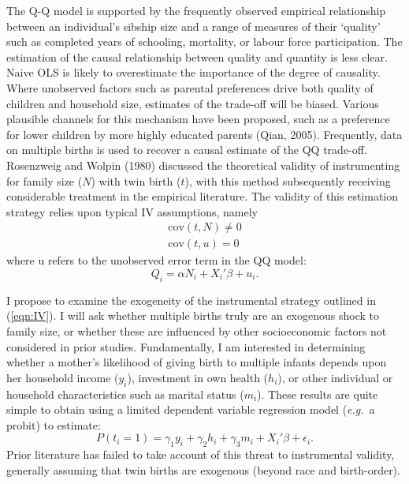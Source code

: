 \documentclass{article}[11pt,subeqn]
\begin{document}
\begin{spacing}{1.25}
The Q-Q model is supported by the frequently observed empirical relationship between an individual's sibship size and a
range of measures of their `quality' such as completed years of schooling, mortality, or labour force participation.
The estimation of the causal relationship between quality and quantity is less clear. Naive OLS is
likely to overestimate the importance of the degree of causality.  Where unobserved factors such
as parental preferences drive both quality of children and household size, estimates of the
trade-off will be biased.  Various plausible channels for this mechanism have been proposed, such
as a preference for lower children by more highly educated parents (Qian, 2005). Frequently, data
on multiple births is used to recover a causal estimate of the QQ trade-off. Rosenzweig and Wolpin
(1980) discussed the theoretical validity of instrumenting for family size ($N$) with twin birth ($t$),
with this method subsequently receiving considerable treatment in the empirical literature.  The
validity of this estimation strategy relies upon typical IV assumptions, namely
\begin{equation}
\label{eqn:IV}
\begin{aligned}
\text{cov}(t,N)\neq0 \\
\text{cov}(t,u)=0
\end{aligned}
\end{equation}
where u refers to the unobserved error term in the QQ model:
\begin{equation}
\label{eqn:model}
Q_i=\alpha N_i + X_i'\beta + u_i.
\end{equation}

I propose to examine the exogeneity of the instrumental strategy outlined in (\ref{eqn:IV}).
I will ask whether multiple births truly are an exogenous shock to family size, or whether these are
influenced by other socioeconomic factors not considered in prior studies.  Fundamentally, I am
interested in determining whether a mother's likelihood of giving birth to multiple infants depends upon
her household income ($y_i$), investment in own health ($h_i$), or other individual or household
characteristics such as marital status ($m_i$).  These results are quite simple to obtain using a limited
dependent variable regression model (\emph{e.g.}\ a probit) to estimate:
\begin{equation}
\label{eqn:twin}
P(t_i=1)=\gamma_1 y_i + \gamma_2 h_i + \gamma_3 m_i +X_i'\beta + \epsilon_i.
\end{equation}
Prior literature has failed to take account of this threat to instrumental validity, generally assuming
that twin births are exogenous (beyond race and birth-order).


\end{spacing}
\end{document}
